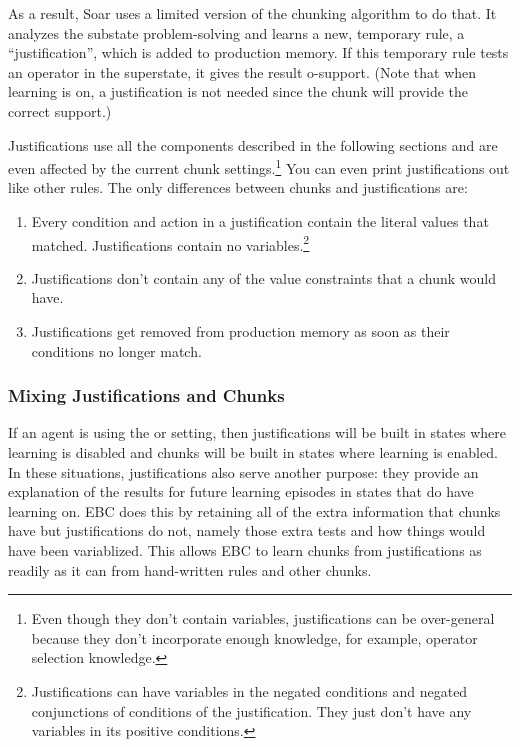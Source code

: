 \begin{itemize}
As a result, Soar uses a limited version of the chunking algorithm to do that.  It analyzes the substate problem-solving and learns a new, temporary rule, a ``justification'', which is added to production memory.  If this temporary rule tests an operator in the superstate, it gives the result o-support. (Note that when learning is on, a justification is not needed since the chunk will provide the correct support.)

Justifications use all the components described in the following sections and are even affected by the current chunk settings.\footnote{
	Even though they don't contain variables, justifications can be over-general because they don't incorporate enough knowledge, for example, operator selection knowledge.}
 You can even print justifications out like other rules.  The only differences between chunks and justifications are:
 
 \begin{enumerate}
	\item Every condition and action in a justification contain the literal values that matched.  Justifications contain no variables.\footnote{
		Justifications can have variables in the negated conditions and negated conjunctions of conditions of the justification.  They just don't have any variables in its positive conditions.}
	\item Justifications don't contain any of the value constraints that a chunk would have.
	\item Justifications get removed from production memory as soon as their conditions no longer match. 
 \end{enumerate}

 \subsubsection{Mixing Justifications and Chunks}
 
If an agent is using the  or  setting, then justifications will be built in states where learning is disabled and chunks will be built in states where learning is enabled.  In these situations, justifications also serve another purpose:  they provide an explanation of the results for future learning episodes in states that do have learning on.  EBC does this by retaining all of the extra information that chunks have but justifications do not, namely those extra tests and how things would have been variablized.  This allows EBC to learn chunks from justifications as readily as it can from hand-written rules and other chunks.


\end{itemize}

